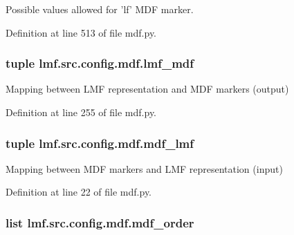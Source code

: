 Possible values allowed for 'lf' M\+D\+F marker. 



Definition at line 513 of file mdf.\+py.

\hypertarget{namespacelmf_1_1src_1_1config_1_1mdf_a78d8f1444783c1b86cbbd91f49a0cd4f}{
\subsubsection[{lmf\+\_\+mdf}]{\setlength{\rightskip}{0pt plus 5cm}tuple lmf.\+src.\+config.\+mdf.\+lmf\+\_\+mdf}}\label{namespacelmf_1_1src_1_1config_1_1mdf_a78d8f1444783c1b86cbbd91f49a0cd4f}


Mapping between L\+M\+F representation and M\+D\+F markers (output) 



Definition at line 255 of file mdf.\+py.

\hypertarget{namespacelmf_1_1src_1_1config_1_1mdf_a888cd9df8b9511d408e646dc404b5232}{
\subsubsection[{mdf\+\_\+lmf}]{\setlength{\rightskip}{0pt plus 5cm}tuple lmf.\+src.\+config.\+mdf.\+mdf\+\_\+lmf}}\label{namespacelmf_1_1src_1_1config_1_1mdf_a888cd9df8b9511d408e646dc404b5232}


Mapping between M\+D\+F markers and L\+M\+F representation (input) 



Definition at line 22 of file mdf.\+py.

\hypertarget{namespacelmf_1_1src_1_1config_1_1mdf_afe5efb72442beb65b5083335b744845c}{
\subsubsection[{mdf\+\_\+order}]{\setlength{\rightskip}{0pt plus 5cm}list lmf.\+src.\+config.\+mdf.\+mdf\+\_\+order}}\label{namespacelmf_1_1src_1_1config_1_1mdf_afe5efb72442beb65b5083335b744845c}


